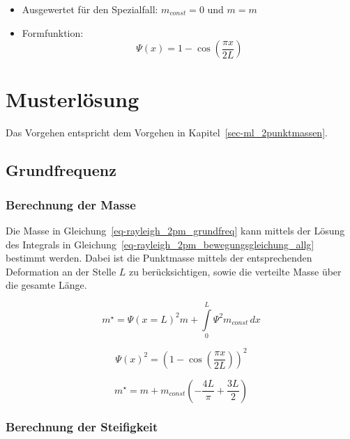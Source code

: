 \documentclass[
  letterpaper,
  DIV=11]{scrreprt}
\providecommand{\tightlist}{%
  \setlength{\itemsep}{0pt}\setlength{\parskip}{0pt}}\usepackage{longtable,booktabs,array}
\begin{document}
\begin{itemize}
\tightlist
\item
  Ausgewertet für den Spezialfall: \(m_{const} = 0 \text{ und } m = m\)
\item
  Formfunktion: \[ \Psi(x) = 1 - \cos(\frac{\pi x}{2L})\]
\end{itemize}

\newpage{}

\hypertarget{musterluxf6sung}{%
\section{Musterlösung}\label{musterluxf6sung}}

Das Vorgehen entspricht dem Vorgehen in
Kapitel~\ref{sec-ml_2punktmassen}.

\hypertarget{grundfrequenz-1}{%
\subsection{Grundfrequenz}\label{grundfrequenz-1}}

\hypertarget{berechnung-der-masse-1}{%
\subsubsection{Berechnung der Masse}\label{berechnung-der-masse-1}}

Die Masse in Gleichung~\ref{eq-rayleigh_2pm_grundfreq} kann mittels der
Lösung des Integrals in
Gleichung~\ref{eq-rayleigh_2pm_bewegungsgleichung_allg} bestimmt werden.
Dabei ist die Punktmasse mittels der entsprechenden Deformation an der
Stelle \(L\) zu berücksichtigen, sowie die verteilte Masse über die
gesamte Länge.

\begin{equation}m^{\star} = \Psi(x=L)^{2} m + \int\limits_{0}^{L} \Psi^{2} m_{const}\, dx\end{equation}

\begin{equation}\Psi(x)^{2} = \left(1 - \cos{\left(\frac{\pi x}{2 L} \right)}\right)^{2}\end{equation}

\begin{equation}m^{\star} = m + m_{const} \left(- \frac{4 L}{\pi} + \frac{3 L}{2}\right)\end{equation}

\hypertarget{berechnung-der-steifigkeit-1}{%
\subsubsection{Berechnung der
Steifigkeit}\label{berechnung-der-steifigkeit-1}}
\end{document}
